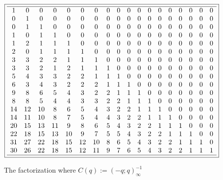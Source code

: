\documentclass[10pt,reqno]{amsart}
\numberwithin{figure}{section}
\numberwithin{table}{section}
\theoremstyle{plain}
\numberwithin{theorem}{section}
\theoremstyle{remark}
\begin{document}
\begin{figure}[ht!]
\begin{minipage}{\linewidth} 
\begin{center} 
\tiny 
\begin{equation*} 
\boxed{ 
\begin{array}{cccccccccccccccccc} \hline 
 1 & 0 & 0 & 0 & 0 & 0 & 0 & 0 & 0 & 0 & 0 & 0 & 0 & 0 & 0 & 0 & 0 & 0 \\
 0 & 1 & 0 & 0 & 0 & 0 & 0 & 0 & 0 & 0 & 0 & 0 & 0 & 0 & 0 & 0 & 0 & 0 \\
 0 & 1 & 1 & 0 & 0 & 0 & 0 & 0 & 0 & 0 & 0 & 0 & 0 & 0 & 0 & 0 & 0 & 0 \\
 1 & 0 & 1 & 1 & 0 & 0 & 0 & 0 & 0 & 0 & 0 & 0 & 0 & 0 & 0 & 0 & 0 & 0 \\
 1 & 2 & 1 & 1 & 1 & 0 & 0 & 0 & 0 & 0 & 0 & 0 & 0 & 0 & 0 & 0 & 0 & 0 \\
 2 & 0 & 1 & 1 & 1 & 1 & 0 & 0 & 0 & 0 & 0 & 0 & 0 & 0 & 0 & 0 & 0 & 0 \\
 3 & 3 & 2 & 2 & 1 & 1 & 1 & 0 & 0 & 0 & 0 & 0 & 0 & 0 & 0 & 0 & 0 & 0 \\
 3 & 3 & 2 & 1 & 2 & 1 & 1 & 1 & 0 & 0 & 0 & 0 & 0 & 0 & 0 & 0 & 0 & 0 \\
 5 & 4 & 3 & 3 & 2 & 2 & 1 & 1 & 1 & 0 & 0 & 0 & 0 & 0 & 0 & 0 & 0 & 0 \\
 6 & 3 & 4 & 3 & 2 & 2 & 2 & 1 & 1 & 1 & 0 & 0 & 0 & 0 & 0 & 0 & 0 & 0 \\
 9 & 8 & 6 & 5 & 4 & 3 & 2 & 2 & 1 & 1 & 1 & 0 & 0 & 0 & 0 & 0 & 0 & 0 \\
 8 & 8 & 5 & 4 & 4 & 3 & 3 & 2 & 2 & 1 & 1 & 1 & 0 & 0 & 0 & 0 & 0 & 0 \\
 14 & 12 & 10 & 8 & 6 & 5 & 4 & 3 & 2 & 2 & 1 & 1 & 1 & 0 & 0 & 0 & 0 & 0 \\
 14 & 11 & 10 & 8 & 7 & 5 & 4 & 4 & 3 & 2 & 2 & 1 & 1 & 1 & 0 & 0 & 0 & 0 \\
 20 & 15 & 13 & 11 & 9 & 8 & 6 & 5 & 4 & 3 & 2 & 2 & 1 & 1 & 1 & 0 & 0 & 0 \\
 22 & 18 & 15 & 13 & 10 & 9 & 7 & 5 & 5 & 4 & 3 & 2 & 2 & 1 & 1 & 1 & 0 & 0 \\
 31 & 27 & 22 & 18 & 15 & 12 & 10 & 8 & 6 & 5 & 4 & 3 & 2 & 2 & 1 & 1 & 1 & 0 \\
 30 & 26 & 22 & 18 & 15 & 12 & 11 & 9 & 7 & 6 & 5 & 4 & 3 & 2 & 2 & 1 & 1 & 1 \\
 \hline 
\end{array}
} 
\end{equation*} 
\end{center} 
\end{minipage}

\caption{The factorization where $C(q) := (-q; q)_{\infty}^{-1}$} 
\label{figure_factpair_v1} 

\end{figure} 
\end{document}

